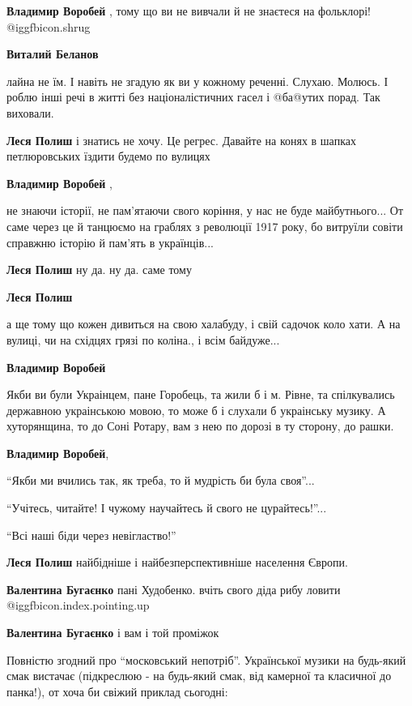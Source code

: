 \begin{itemize}
\begin{itemize}
\textbf{Владимир Воробей} , тому що ви не вивчали й не знаєтеся на фольклорі! @igg{fbicon.shrug} 

\textbf{Виталий Беланов} 

лайна не їм. І навіть не згадую як ви у кожному реченні. Слухаю. Молюсь. І
роблю інші речі в житті без націоналістичних гасел і @ба@утих порад. Так
виховали.

\textbf{Леся Полиш} і знатись не хочу. Це регрес. Давайте на конях в шапках петлюровських їздити будемо по вулицях

\textbf{Владимир Воробей} , 

не знаючи історії, не пам'ятаючи свого коріння, у нас не буде майбутнього... От
саме через це й танцюємо на граблях з революції 1917 року, бо витруїли совіти
справжню історію й пам'ять в українців...

\textbf{Леся Полиш} ну да. ну да. саме тому

\textbf{Леся Полиш} 

а ще тому що кожен дивиться на свою халабуду, і свій садочок коло хати. А на
вулиці, чи на східцях грязі по коліна., і всім байдуже...

\textbf{Владимир Воробей} 

Якби ви були Украінцем, пане Горобець, та жили б і м. Рівне, та спілкувались
державною украінською мовою, то може б і слухали б украінську музику. А
хуторянщина, то до Соні Ротару, вам з нею по дорозі в ту сторону, до рашки.

\textbf{Владимир Воробей}, 

\enquote{Якби ми вчились так, як треба, то й мудрість би була своя}...

\enquote{Учітесь, читайте! І чужому научайтесь й свого не цурайтесь!}...

\enquote{Всі наші біди через невігластво!}

\textbf{Леся Полиш} найбідніше і найбезперспективніше населення Європи.

\textbf{Валентина Бугаєнко} пані Худобенко. вчіть свого діда рибу ловити @igg{fbicon.index.pointing.up}

\textbf{Валентина Бугаєнко} і вам і той проміжок


Повністю згодний про \enquote{московський непотріб}. Української музики на будь-який
смак вистачає (підкреслюю - на будь-який смак, від камерної та класичної до
панка!), от хоча би свіжий приклад сьогодні:


\end{itemize}
\end{itemize}
